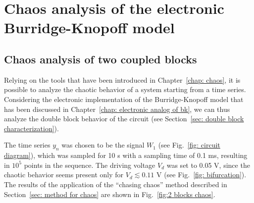 \chapter{Chaos analysis of the electronic Burridge-Knopoff model}\label{chap: chaos analysis}


\section{Chaos analysis of two coupled blocks}\label{sec: 2 blocks chaos}

Relying on the tools that have been introduced in Chapter~\ref{chap: chaos},
it is possible to analyze the chaotic behavior of a system starting from a time series.
Considering the electronic implementation of the Burridge-Knopoff model that has been discussed
in Chapter~\ref{chap: electronic analog of bk}, we can thus analyze the double block behavior
of the circuit (see Section~\ref{sec: double block characterization}).

The time series $y_n$ was chosen to be the signal $W_1$ (see Fig.~\ref{fig: circuit diagram}),
which was sampled for 10 s with a sampling time of 0.1 ms, resulting in $10^5$ points in the sequence.
The driving voltage $V_d$ was set to 0.05 V, since the chaotic behavior seems present only for
$V_d \lesssim 0.11$ V (see Fig.~\ref{fig: bifurcation}). The results of the application of the
``chasing chaos'' method described in Section~\ref{sec: method for chaos} are shown in Fig.~\ref{fig:2 blocks chaos}.

